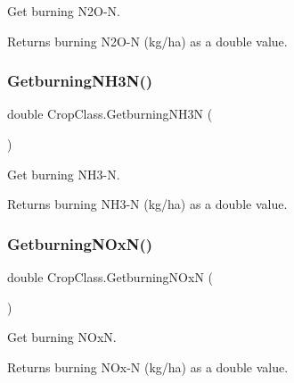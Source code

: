 Get burning N2\+O-\/N. 

\begin{DoxyReturn}{Returns}
burning N2\+O-\/N (kg/ha) as a double value. 
\end{DoxyReturn}
\mbox{\label{class_crop_class_ad6c4f92731a11322c64054127124ff8c}} 
\subsubsection{\texorpdfstring{GetburningNH3N()}{GetburningNH3N()}}
{\footnotesize\ttfamily double Crop\+Class.\+Getburning\+N\+H3N (\begin{DoxyParamCaption}{ }\end{DoxyParamCaption})\hspace{0.3cm}{\ttfamily [inline]}}



Get burning N\+H3-\/N. 

\begin{DoxyReturn}{Returns}
burning N\+H3-\/N (kg/ha) as a double value. 
\end{DoxyReturn}
\mbox{\label{class_crop_class_a051aa055cabad8c5bd5a6ad51decce3a}} 
\subsubsection{\texorpdfstring{GetburningNOxN()}{GetburningNOxN()}}
{\footnotesize\ttfamily double Crop\+Class.\+Getburning\+N\+OxN (\begin{DoxyParamCaption}{ }\end{DoxyParamCaption})\hspace{0.3cm}{\ttfamily [inline]}}



Get burning N\+OxN. 

\begin{DoxyReturn}{Returns}
burning N\+Ox-\/N (kg/ha) as a double value. 
\end{DoxyReturn}
\mbox{\label{class_crop_class_aed98396d4eef588c681a3d99728fe83f}} 
